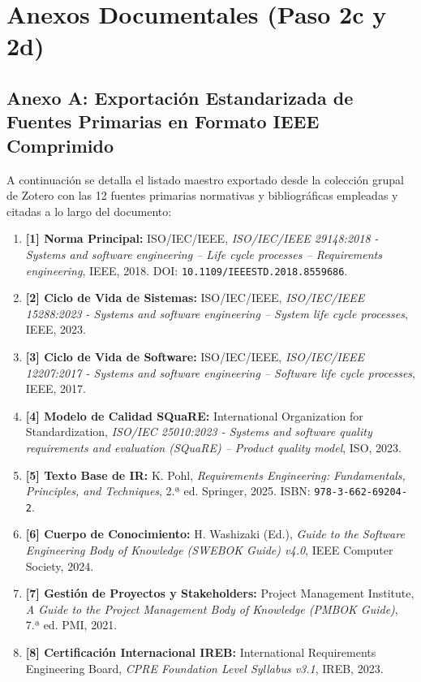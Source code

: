 \section*{Anexos Documentales (Paso 2c y 2d)}

\subsection*{Anexo A: Exportación Estandarizada de Fuentes Primarias en Formato IEEE Comprimido}
A continuación se detalla el listado maestro exportado desde la colección grupal de Zotero con las 12 fuentes primarias normativas y bibliográficas empleadas y citadas a lo largo del documento:
\begin{enumerate}
    \item \textbf{[1] Norma Principal:} ISO/IEC/IEEE, \textit{ISO/IEC/IEEE 29148:2018 - Systems and software engineering -- Life cycle processes -- Requirements engineering}, IEEE, 2018. DOI: \texttt{10.1109/IEEESTD.2018.8559686}.
    \item \textbf{[2] Ciclo de Vida de Sistemas:} ISO/IEC/IEEE, \textit{ISO/IEC/IEEE 15288:2023 - Systems and software engineering -- System life cycle processes}, IEEE, 2023.
    \item \textbf{[3] Ciclo de Vida de Software:} ISO/IEC/IEEE, \textit{ISO/IEC/IEEE 12207:2017 - Systems and software engineering -- Software life cycle processes}, IEEE, 2017.
    \item \textbf{[4] Modelo de Calidad SQuaRE:} International Organization for Standardization, \textit{ISO/IEC 25010:2023 - Systems and software quality requirements and evaluation (SQuaRE) -- Product quality model}, ISO, 2023.
    \item \textbf{[5] Texto Base de IR:} K. Pohl, \textit{Requirements Engineering: Fundamentals, Principles, and Techniques}, 2.ª ed. Springer, 2025. ISBN: \texttt{978-3-662-69204-2}.
    \item \textbf{[6] Cuerpo de Conocimiento:} H. Washizaki (Ed.), \textit{Guide to the Software Engineering Body of Knowledge (SWEBOK Guide) v4.0}, IEEE Computer Society, 2024.
    \item \textbf{[7] Gestión de Proyectos y Stakeholders:} Project Management Institute, \textit{A Guide to the Project Management Body of Knowledge (PMBOK Guide)}, 7.ª ed. PMI, 2021.
    \item \textbf{[8] Certificación Internacional IREB:} International Requirements Engineering Board, \textit{CPRE Foundation Level Syllabus v3.1}, IREB, 2023.

\end{enumerate}
